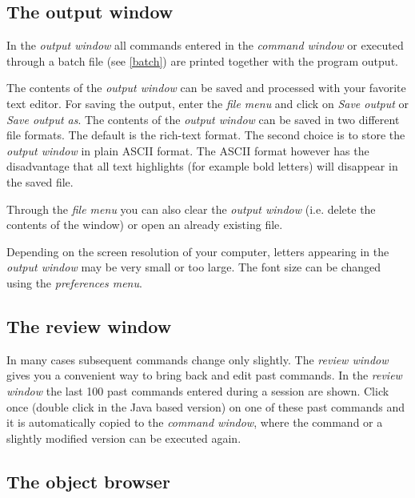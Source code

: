 \subsection{The output window}
 

In the {\em output window} all commands entered in the {\em
command window} or executed through a batch file (see
\autoref{batch}) are printed together with the program output.

 The contents of the {\em output window} can be
saved and processed with your favorite text editor. For saving the
output, enter the {\em file menu} and click on {\em Save output}
or {\em Save output as}. The contents of the {\em output window} can be
saved in two different file formats. The default is the rich-text
format. The second choice is to store the {\em output window} in plain
ASCII format. The ASCII format however has the disadvantage that
all text highlights (for example bold letters) will disappear in
the saved file.

Through the {\em file menu} you can also clear the {\em output window}
(i.e. delete the contents of the window) or open an already
existing file.

Depending on the screen resolution of your computer, letters
appearing in the {\em output window} may be very small or too large. The
font size can be changed  using the {\em preferences menu}.



\subsection{The review window}
 

In many cases subsequent commands change only slightly. The {\em
review window} gives you a convenient way to bring back and edit
past commands. In the {\em review window} the last 100 past
commands entered during a session are shown. Click once (double
click in the Java based version) on one of these past commands and
it is automatically copied to the {\em command window}, where the
command or a slightly modified version can be executed again.

\subsection{The object browser}

